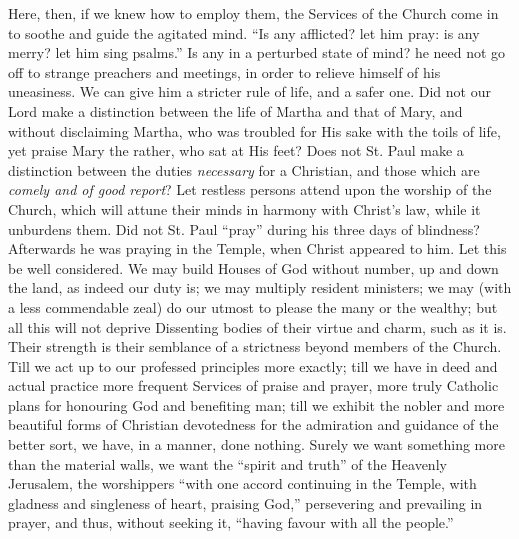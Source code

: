 Here, then, if we knew how to employ them, the Services of the
Church come in to soothe and guide the agitated mind. ``Is any
afflicted? let him pray: is any merry? let him sing psalms.'' Is
any in a perturbed state of mind? he need not go off to strange
preachers and meetings, in order to relieve himself of his uneasiness.
We can give him a stricter rule of life, and a safer one. Did not our
Lord make a distinction between the life of Martha and that of Mary,
and without disclaiming Martha, who was troubled for His sake with the
toils of life, yet praise Mary the rather, who sat at His feet? Does
not St. Paul make a distinction between the duties \emph{necessary}
for a Christian, and those which are \emph{comely and of good report}?
Let restless persons attend upon the worship of the Church, which will
attune their minds in harmony with Christ's law, while it unburdens
them. Did not St. Paul ``pray'' during his three days of
blindness? Afterwards he was praying in the Temple, when Christ
appeared to him. Let this be well considered. We may build Houses of
God without number, up and down the land, as indeed our duty is; we
may multiply resident ministers; we may (with a less commendable zeal)
do our utmost to please the many or the wealthy; but all this will not
deprive Dissenting bodies of their virtue and charm, such as it is.
Their strength is their semblance of a strictness beyond members of
the Church. Till we act up to our professed principles more exactly;
till we have in deed and actual practice more frequent Services of
praise and prayer, more truly Catholic plans for honouring God and
benefiting man; till we exhibit the nobler and more beautiful forms of
Christian devotedness for the admiration and guidance of the better
sort, we have, in a manner, done nothing. Surely we want something
more than the material walls, we want the ``spirit and truth''
of the Heavenly Jerusalem, the worshippers ``with one accord
continuing in the Temple, with gladness and singleness of heart,
praising God,'' persevering and prevailing in prayer, and thus,
without seeking it, ``having favour with all the people.''

